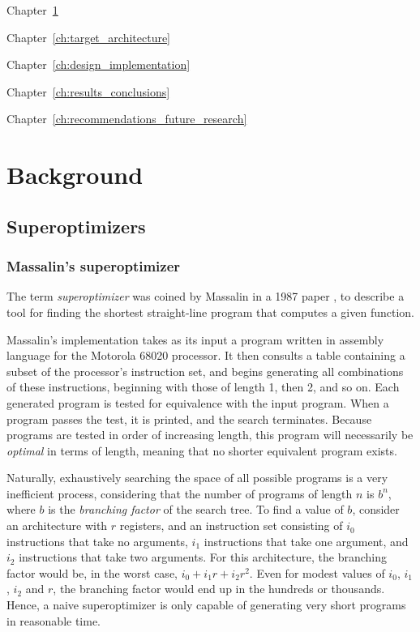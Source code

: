\documentclass[a4paper,11pt]{kth-mag}
\begin{document}

Chapter~\ref{ch:background}

Chapter~\ref{ch:target_architecture}

Chapter~\ref{ch:design_implementation}

Chapter~\ref{ch:results_conclusions}

Chapter~\ref{ch:recommendations_future_research}


\chapter{Background}
\label{ch:background}

\section{Superoptimizers}

\subsection{Massalin's superoptimizer}

The term \emph{superoptimizer} was coined by Massalin in a 1987 paper \cite{massalin87}, to describe a tool for finding the shortest straight-line program that computes a given function.

Massalin's implementation takes as its input a program written in assembly language for the Motorola 68020 processor.
It then consults a table containing a subset of the processor's instruction set, and begins generating all combinations of these instructions, beginning with those of length 1, then 2, and so on.
Each generated program is tested for equivalence with the input program.
When a program passes the test, it is printed, and the search terminates.
Because programs are tested in order of increasing length, this program will necessarily be \emph{optimal} in terms of length, meaning that no shorter equivalent program exists.

Naturally, exhaustively searching the space of all possible programs is a very inefficient process, considering that the number of programs of length $n$ is $b^n$, where $b$ is the \emph{branching factor} of the search tree.
To find a value of $b$, consider an architecture with $r$ registers, and an instruction set consisting of $i_0$ instructions that take no arguments, $i_1$ instructions that take one argument, and $i_2$ instructions that take two arguments.
For this architecture, the branching factor would be, in the worst case, $i_0+i_1r+i_2r^2$.
Even for modest values of $i_0$, $i_1$, $i_2$ and $r$, the branching factor would end up in the hundreds or thousands.
Hence, a naive superoptimizer is only capable of generating very short programs in reasonable time.
\end{document}
